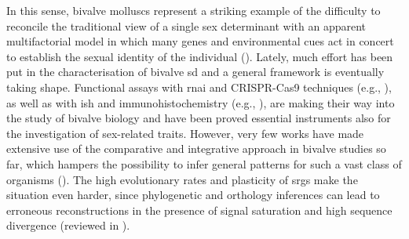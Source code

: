 In this sense, bivalve molluscs represent a striking example of the difficulty to reconcile the traditional view of a single sex determinant with an apparent multifactorial model in which many genes and environmental cues act in concert to establish the sexual identity of the individual (\textbf{\cite{breton2018sex}}). Lately, much effort has been put in the characterisation of bivalve \gls{sd} and a general framework is eventually taking shape. Functional assays with \gls{rnai} and CRISPR-Cas9 techniques (e.g., \textbf{\cite{wang2020identification,sun2022examination,wang2022transcriptome}}), as well as with \gls{ish} and immunohistochemistry (e.g., \textbf{\cite{perez2011cytogenetic,milani2013nuclear}}), are making their way into the study of bivalve biology and have been proved essential instruments also for the investigation of sex-related traits. However, very few works have made extensive use of the comparative and integrative approach in bivalve studies so far, which hampers the possibility to infer general patterns for such a vast class of organisms (\textbf{\cite{milani2020faraway}}). The high evolutionary rates and plasticity of \glspl{srg} make the situation even harder, since phylogenetic and orthology inferences can lead to erroneous reconstructions in the presence of signal saturation and high sequence divergence (reviewed in \textbf{\cite{natsidis2021systematic,lozano2022practical}}).

% 